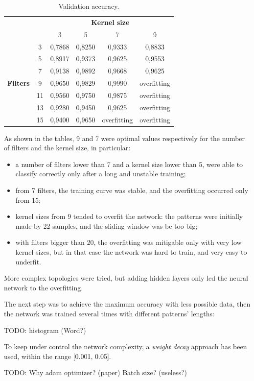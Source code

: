 \begin{table}[ht]
	\centering
	\begin{tabular}{cccccc}
									  &                         & \multicolumn{4}{c}{\textbf{Kernel size}}    \\
									  & \multicolumn{1}{c|}{}   & 3      & 5      & 7           & 9           \\ \cline{2-6} 
	\multirow{7}{*}{\textbf{Filters}} & \multicolumn{1}{c|}{3}  & 0,7868 & 0,8250 & 0,9333      & 0,8833      \\
								      & \multicolumn{1}{c|}{5}  & 0,8917 & 0,9373 & 0,9625      & 0,9553      \\
									  & \multicolumn{1}{c|}{7}  & 0,9138 & 0,9892 & 0,9668      & 0,9625      \\
									  & \multicolumn{1}{c|}{9}  & 0,9650 & 0,9829 & 0,9990      & overfitting \\
									  & \multicolumn{1}{c|}{11} & 0,9560 & 0,9750 & 0,9875      & overfitting \\
									  & \multicolumn{1}{c|}{13} & 0,9280 & 0,9450 & 0,9625      & overfitting \\
									  & \multicolumn{1}{c|}{15} & 0,9400 & 0,9650 & overfitting & overfitting
	\end{tabular}
	\caption{Validation accuracy.}
\end{table}
As shown in the tables, 9 and 7 were optimal values respectively for the number of filters and the kernel size, in particular:
\begin{itemize}
	\item a number of filters lower than 7 and a kernel size lower than 5, were able to classify correctly only after a long and unstable training;
	\item from 7 filters, the training curve was stable, and the overfitting occurred only from 15;
	\item kernel sizes from 9 tended to overfit the network: the patterns were initially made by 22 samples, and the sliding window was be too big;
	\item with filters bigger than 20, the overfitting was mitigable only with very low kernel sizes, but in that case the network was hard to train, and very easy to underfit.
\end{itemize}
More complex topologies were tried, but adding hidden layers only led the neural network to the overfitting.

The next step was to achieve the maximum accuracy with less possible data, then the network was trained several times with different patterns' lengths:
\bigbreak

TODO: histogram (Word?)
\bigbreak

To keep under control the network complexity, a \textit{weight decay} approach has been used, within the range [0.001, 0.05].
\bigbreak

TODO: Why adam optimizer? (paper) Batch size? (useless?)
